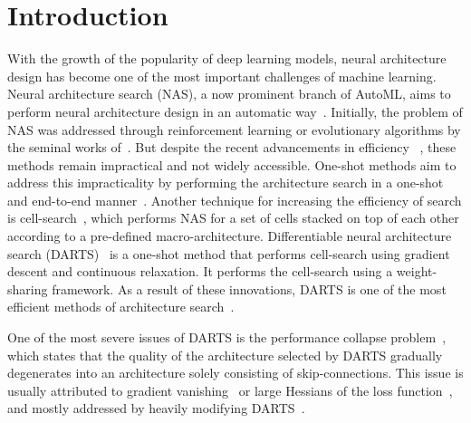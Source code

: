\documentclass{article} \usepackage{fancyhdr, iclr2023_conference, times}
\begin{document}
\section{Introduction}
\par With the growth of the popularity of deep learning models, neural architecture design has become one of the most important challenges of machine learning. Neural architecture search (NAS), a now prominent branch of AutoML, aims to perform neural architecture design in an automatic way~\citep{DBLP:journals/jmlr/ElskenMH19, DBLP:journals/csur/RenXCHLCW21}. Initially, the problem of NAS was addressed through reinforcement learning or evolutionary algorithms by the seminal works of~\citep{DBLP:conf/iclr/ZophL17, DBLP:conf/iclr/BakerGNR17, DBLP:journals/ec/StanleyM02, DBLP:conf/icml/RealMSSSTLK17}. But despite the recent advancements in efficiency ~\citep{DBLP:conf/iclr/BakerGRN18, DBLP:conf/eccv/LiuZNSHLFYHM18, DBLP:conf/aaai/CaiCZYW18}, these methods remain impractical and not widely accessible. One-shot methods aim to address this impracticality by performing the architecture search in a one-shot and end-to-end manner~\citep{DBLP:conf/iclr/LiuSY19,DBLP:conf/eccv/GuoZMHLWS20,DBLP:conf/icml/PhamGZLD18,DBLP:conf/iclr/BrockLRW18,DBLP:conf/icml/BenderKZVL18}. Another technique for increasing the efficiency of search is cell-search~\citep{DBLP:conf/cvpr/ZophVSL18}, which performs NAS for a set of cells stacked on top of each other according to a pre-defined macro-architecture. 
Differentiable neural architecture search (DARTS)~\citep{DBLP:conf/iclr/LiuSY19} is a one-shot method that performs cell-search using gradient descent and continuous relaxation. It performs the cell-search using a weight-sharing framework. As a result of these innovations, DARTS is one of the most efficient methods of architecture search~\citep{DBLP:journals/jmlr/ElskenMH19}.
\par One of the most severe issues of DARTS is the performance collapse problem~\citep{DBLP:conf/iclr/ZelaESMBH20}, which states that the quality of the architecture selected by DARTS gradually degenerates into an architecture solely consisting of skip-connections. This issue is usually attributed to gradient vanishing~\citep{DBLP:conf/nips/ZhouXSH20} or large Hessians of the loss function~\citep{DBLP:conf/iclr/ZelaESMBH20}, and mostly addressed by heavily modifying DARTS~\citep{DBLP:conf/iclr/ChuW0LWY21,DBLP:conf/iclr/WangCCTH21, DBLP:conf/cvpr/GuW0YWLC21,DBLP:journals/corr/abs-2203-01665}.
\end{document}
